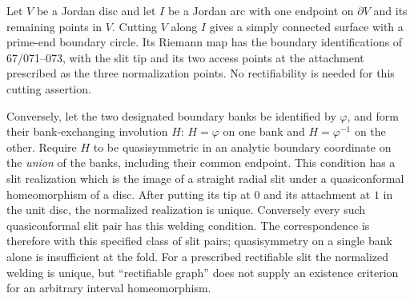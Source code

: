\begin{proposition}\label{A:slit}
Let $V$ be a Jordan disc and let $I$ be a Jordan arc with one
endpoint on $\partial V$ and its remaining points in $V$. Cutting
$V$ along $I$ gives a simply connected surface with a prime-end
boundary circle. Its Riemann map has the boundary identifications
of 67/071--073, with the slit tip and its two access points at
the attachment prescribed as the three normalization points.
No rectifiability is needed for this cutting assertion.

Conversely, let the two designated boundary banks be identified
by $\varphi$, and form their bank-exchanging involution $H$:
$H=\varphi$ on one bank and $H=\varphi^{-1}$ on the other.
Require $H$ to be quasisymmetric in an analytic boundary
coordinate on the \emph{union} of the banks, including their
common endpoint. This condition has a slit realization which
is the image of a straight radial slit under a quasiconformal
homeomorphism of a disc. After putting its tip at $0$ and its
attachment at $1$ in the unit disc, the normalized realization
is unique. Conversely every such quasiconformal slit pair has
this welding condition. The correspondence is therefore with
this specified class of slit pairs; quasisymmetry on a single
bank alone is insufficient at the fold.
For a prescribed rectifiable slit the normalized welding is
unique, but ``rectifiable graph'' does not supply an existence
criterion for an arbitrary interval homeomorphism.
\end{proposition}
